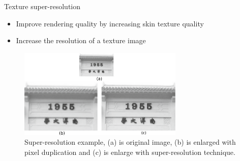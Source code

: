 \documentclass{beamer}
\begin{document}
\begin{frame}{Texture super-resolution}

\begin{itemize}
\setlength\itemsep{0.5em}
\item Improve rendering quality by increasing skin texture quality
\item Increase the resolution of a texture image
\end{itemize}

\begin{figure}
        \centering
        \includegraphics[width=0.7\textwidth]{img/super-resolution-int}
        \caption{Super-resolution example, (a) is original image, (b) is enlarged with pixel duplication and (c) is enlarge with super-resolution technique.}
\end{figure}

\end{frame}

\end{document}
